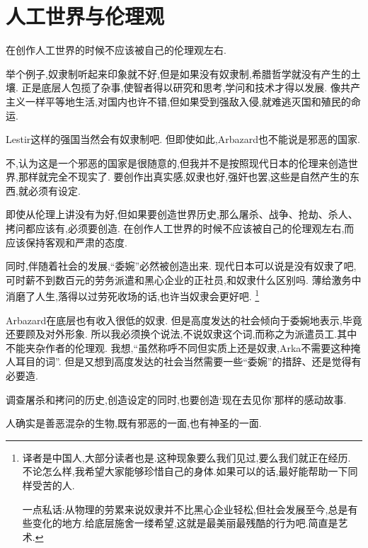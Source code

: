 \chapter{人工世界与伦理观}
在创作人工世界的时候不应该被自己的伦理观左右.

举个例子,奴隶制听起来印象就不好,但是如果没有奴隶制,希腊哲学就没有产生的土壤.
正是底层人包揽了杂事,使智者得以研究和思考,学问和技术才得以发展.
像共产主义一样平等地生活,对国内也许不错,但如果受到强敌入侵,就难逃灭国和殖民的命运.

Lestir这样的强国当然会有奴隶制吧.
但即使如此,Arbazard也不能说是邪恶的国家.

不,认为这是一个邪恶的国家是很随意的,但我并不是按照现代日本的伦理来创造世界,那样就完全不现实了.
要创作出真实感,奴隶也好,强奸也罢,这些是自然产生的东西,就必须有设定.

即使从伦理上讲没有为好,但如果要创造世界历史,那么屠杀、战争、抢劫、杀人、拷问都应该有,必须要创造.
在创作人工世界的时候不应该被自己的伦理观左右,而应该保持客观和严肃的态度.


同时,伴随着社会的发展,``委婉''必然被创造出来.
现代日本可以说是没有奴隶了吧,可时薪不到数百元的劳务派遣和黑心企业的正社员,和奴隶什么区别吗.
薄给激务中消磨了人生,落得以过劳死收场的话,也许当奴隶会更好吧.
\footnote{译者是中国人,大部分读者也是.这种现象要么我们见过,要么我们就正在经历.
不论怎么样,我希望大家能够珍惜自己的身体.如果可以的话,最好能帮助一下同样受苦的人.

一点私话:从物理的劳累来说奴隶并不比黑心企业轻松,但社会发展至今,总是有些变化的地方.给底层施舍一缕希望,这就是最美丽最残酷的行为吧.简直是艺术.
}

Arbazard在底层也有收入很低的奴隶.
但是高度发达的社会倾向于委婉地表示,毕竟还要顾及对外形象.
所以我必须换个说法,不说奴隶这个词,而称之为派遣员工.其中不能夹杂作者的伦理观.
我想,``虽然称呼不同但实质上还是奴隶,Arka不需要这种掩人耳目的词''.
但是又想到高度发达的社会当然需要一些``委婉''的措辞、还是觉得有必要造.

调查屠杀和拷问的历史,创造设定的同时,也要创造‘现在去见你’那样的感动故事.

人确实是善恶混杂的生物,既有邪恶的一面,也有神圣的一面.